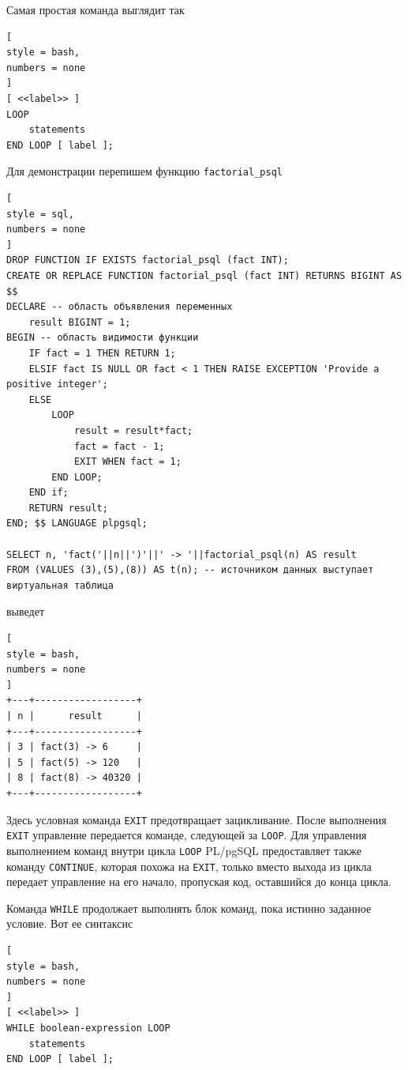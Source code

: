 \documentclass[%
	11pt,
	a4paper,
	utf8,
		]{article}
\begin{document}
Самая простая команда выглядит так
\begin{lstlisting}[
style = bash,
numbers = none
]
[ <<label>> ]
LOOP
    statements
END LOOP [ label ];
\end{lstlisting}

Для демонстрации перепишем функцию \texttt{factorial\_psql}
\begin{lstlisting}[
style = sql,
numbers = none
]
DROP FUNCTION IF EXISTS factorial_psql (fact INT); 
CREATE OR REPLACE FUNCTION factorial_psql (fact INT) RETURNS BIGINT AS
$$
DECLARE -- область объявления переменных
    result BIGINT = 1;
BEGIN -- область видимости функции
    IF fact = 1 THEN RETURN 1;
    ELSIF fact IS NULL OR fact < 1 THEN RAISE EXCEPTION 'Provide a positive integer';
    ELSE
        LOOP
            result = result*fact;
            fact = fact - 1;
            EXIT WHEN fact = 1;
        END LOOP;
    END if;
    RETURN result;
END; $$ LANGUAGE plpgsql;

SELECT n, 'fact('||n||')'||' -> '||factorial_psql(n) AS result
FROM (VALUES (3),(5),(8)) AS t(n); -- источником данных выступает виртуальная таблица
\end{lstlisting}
выведет
\begin{lstlisting}[
style = bash,
numbers = none
]
+---+------------------+
| n |      result      |
+---+------------------+
| 3 | fact(3) -> 6     |
| 5 | fact(5) -> 120   |
| 8 | fact(8) -> 40320 |
+---+------------------+
\end{lstlisting}

Здесь условная команда \texttt{EXIT} предотвращает зацикливание. После выполнения \texttt{EXIT} управление передается команде, следующей за \texttt{LOOP}. Для управления выполнением команд внутри цикла \texttt{LOOP} PL/pgSQL предоставляет также команду \texttt{CONTINUE}, которая похожа на \texttt{EXIT}, только вместо выхода из цикла передает управление на его начало, пропуская код, оставшийся до конца цикла.


Команда \texttt{WHILE} продолжает выполнять блок команд, пока истинно заданное условие. Вот ее синтаксис
\begin{lstlisting}[
style = bash,
numbers = none
]
[ <<label>> ]
WHILE boolean-expression LOOP
    statements
END LOOP [ label ];
\end{lstlisting}
\end{document}
